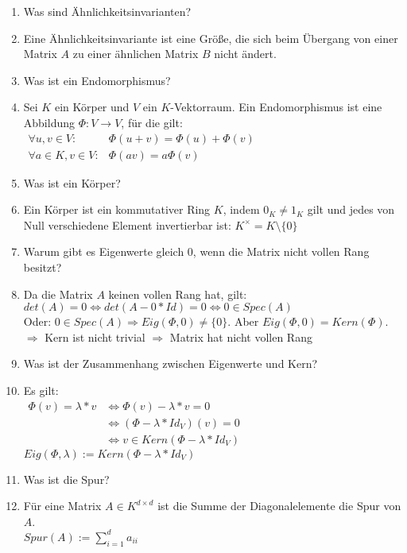 \documentclass[11pt,parskip=full]{scrartcl}
\newcommand{\answer}{\item[\textbf{Antwort}]}
\begin{document}
\begin{enumerate}[label=\textbf{\arabic*. Frage}]
		\item Was sind Ähnlichkeitsinvarianten?
		\answer Eine Ähnlichkeitsinvariante ist eine Größe, die sich beim Übergang von einer Matrix $A$ zu einer ähnlichen Matrix $B$ nicht ändert.
		
		\item Was ist ein Endomorphismus?
		\answer Sei $K$ ein Körper und $V$ ein $K$-Vektorraum. Ein Endomorphismus ist eine Abbildung \(\Phi: V \rightarrow V\), für die gilt:\\
		\(\begin{aligned} \forall u, v \in V : & \Phi(u+v)=\Phi(u)+\Phi(v) \\ \forall a \in K, v \in V : & \Phi(a v)=a \Phi(v) \end{aligned}\) \\
		
		\item Was ist ein Körper?
		\answer Ein Körper ist ein kommutativer Ring $K$, indem \(0_K \neq 1_K\) gilt und jedes von Null verschiedene Element invertierbar ist: \(K^{\times} = K \setminus \{0\}\)
		
		\item Warum gibt es Eigenwerte gleich $0$, wenn die Matrix nicht vollen Rang besitzt?
		\answer Da die Matrix $A$ keinen vollen Rang hat, gilt: \\
		\(det(A) = 0 \iff det(A-0*Id) = 0 \iff 0 \in Spec(A)\) \\
		Oder: \(0 \in Spec(A) \Rightarrow Eig(\Phi, 0) \neq \{0\}\). Aber \(Eig(\Phi, 0) = Kern(\Phi)\).\\
		$\Rightarrow$ Kern ist nicht trivial $\Rightarrow$ Matrix hat nicht vollen Rang
		
		\item Was ist der Zusammenhang zwischen Eigenwerte und Kern?
		\answer Es gilt:\\\(\begin{aligned}
		\Phi(v) = \lambda * v & \iff \Phi(v) - \lambda*v = 0\\
		& \iff (\Phi - \lambda*Id_V)(v) = 0\\
		& \iff v \in Kern(\Phi - \lambda*Id_V) 
		\end{aligned}\)\\
		\(Eig(\Phi, \lambda) := Kern(\Phi - \lambda*Id_V)\)
		
		\item Was ist die Spur?
		\answer Für eine Matrix \(A \in K^{d \times d}\) ist die Summe der Diagonalelemente die Spur von $A$.\\
		\(Spur(A) := \sum_{i=1}^{d} a_{ii}\)
		

\end{enumerate}
\end{document}
